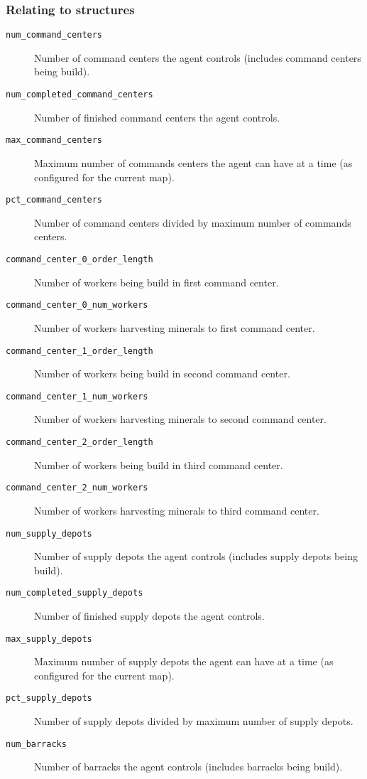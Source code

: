 \subsubsection*{Relating to structures}
\begin{description}
    \item[\texttt{num\_command\_centers}] Number of command centers the agent controls (includes command centers being build).
    \item[\texttt{num\_completed\_command\_centers}] Number of finished command centers the agent controls.
    \item[\texttt{max\_command\_centers}] Maximum number of commands centers the agent can have at a time (as configured for the current map).
    \item[\texttt{pct\_command\_centers}] Number of command centers divided by maximum number of commands centers.
    \item[\texttt{command\_center\_0\_order\_length}] Number of workers being build in first command center.
    \item[\texttt{command\_center\_0\_num\_workers}] Number of workers harvesting minerals to first command center.
    \item[\texttt{command\_center\_1\_order\_length}] Number of workers being build in second command center.
    \item[\texttt{command\_center\_1\_num\_workers}] Number of workers harvesting minerals to second command center.
    \item[\texttt{command\_center\_2\_order\_length}] Number of workers being build in third command center.
    \item[\texttt{command\_center\_2\_num\_workers}] Number of workers harvesting minerals to third command center.
    \item[\texttt{num\_supply\_depots}] Number of supply depots the agent controls (includes supply depots being build).
    \item[\texttt{num\_completed\_supply\_depots}] Number of finished supply depots the agent controls.
    \item[\texttt{max\_supply\_depots}] Maximum number of supply depots the agent can have at a time (as configured for the current map).
    \item[\texttt{pct\_supply\_depots}] Number of supply depots divided by maximum number of supply depots.
    \item[\texttt{num\_barracks}] Number of barracks the agent controls (includes barracks being build).

\end{description}
